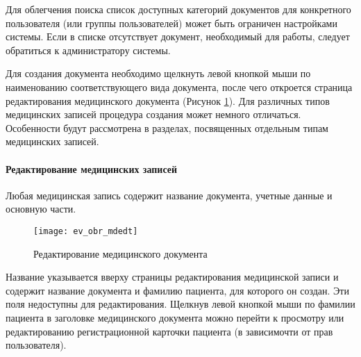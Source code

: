 {\begin{prim}
 Для облегчения поиска список доступных категорий документов для конкретного пользователя (или группы пользователей) может быть ограничен настройками системы. Если в списке отсутствует документ, необходимый для работы, следует обратиться к администратору системы.
\end{prim} 

Для создания документа необходимо щелкнуть левой кнопкой мыши по наименованию соответствующего вида документа, после чего откроется страница редактирования медицинского документа (Рисунок \ref{img_ev_obr_mdedt}). Для различных типов медицинских записей процедура создания может немного отличаться. Особенности будут рассмотрена в разделах, посвященных отдельным типам медицинских записей.

\paragraph{Редактирование медицинских записей} \label{ev_obr_mdedt}

Любая медицинская запись содержит название документа, учетные данные и основную части.

\begin{figure}[!ht]\centering
 \texttt{[image: ev\_obr\_mdedt]}
 \caption{Редактирование медицинского документа}
 \label{img_ev_obr_mdedt}
\end{figure}

Название указывается вверху страницы редактирования медицинской записи и содержит название документа и фамилию пациента, для которого он создан. Эти поля недоступны для редактирования. Щелкнув левой кнопкой мыши по фамилии пациента в заголовке медицинского документа можно перейти к просмотру или редактированию регистрационной карточки пациента (в зависимочти от прав пользователя). 

}
